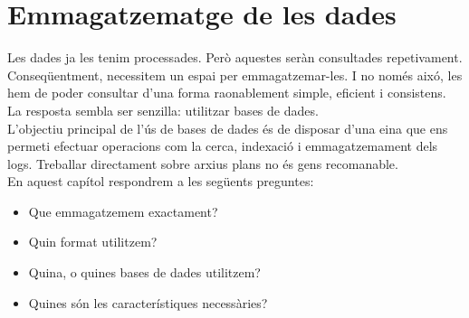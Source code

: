 \chapter{Emmagatzematge de les dades}\label{ch:log-storing}

Les dades ja les tenim processades.
Però aquestes seràn consultades repetivament.
Conseqüentment, necessitem un espai per emmagatzemar-les.
I no només aixó, les hem de poder consultar d'una forma raonablement simple, eficient i consistens. \\

\noindent
La resposta sembla ser senzilla: utilitzar bases de dades. \\

\noindent
L’objectiu principal de l’ús de bases de dades és de disposar d’una eina que ens permeti efectuar operacions com la cerca, indexació i emmagatzemament dels logs.
Treballar directament sobre arxius plans no és gens recomanable. \\

\noindent
En aquest capítol respondrem a les següents preguntes:
\begin{itemize}
    \item Que emmagatzemem exactament?
    \item Quin format utilitzem?
    \item Quina, o quines bases de dades utilitzem?
    \item Quines són les característiques necessàries?
\end{itemize}

\clearpage

\clearpage
